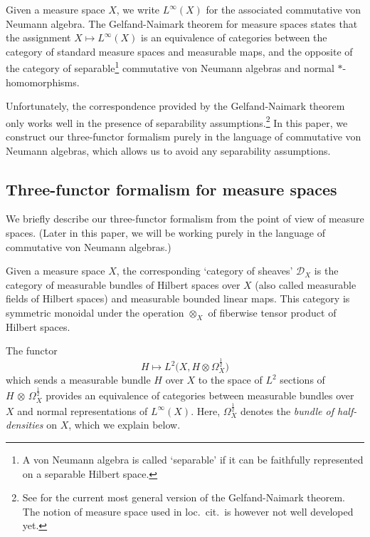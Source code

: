 \documentclass[10pt,a4paper,oneside]{amsart}
\theoremstyle{remark}
\theoremstyle{definition}
\begin{document}
Given a measure space $X$, we write $L^\infty (X)$ for the associated commutative von Neumann algebra.
The Gelfand-Naimark theorem for measure spaces states that
the assignment $X\mapsto L^\infty(X)$ is an equivalence of categories between the category of standard measure spaces and measurable maps, and the opposite of the category of separable\footnote{A von Neumann algebra is called `separable' if it can be faithfully represented on a separable Hilbert space.} commutative von Neumann algebras and normal $*$-homomorphisms.

Unfortunately,
the correspondence provided by the Gelfand-Naimark theorem only works well in the presence of separability assumptions.\footnote{See \cite{Pavlov2022} for the current most general version of the Gelfand-Naimark theorem. The notion of measure space used in loc.~cit.~is however not well developed yet.}
In this paper, we construct our three-functor formalism purely in the language of commutative von Neumann algebras, which allows us to avoid any separability assumptions.



\subsection{Three-functor formalism for measure spaces}\label{sec:threeffmeasure}
We briefly describe our three-functor formalism from the point of view of measure spaces. (Later in this paper, we will be working purely in the language of commutative von Neumann algebras.)


Given a measure space $X$, 
the corresponding `category of sheaves' $\mathcal D_X$ is the category of measurable bundles of Hilbert spaces over $X$ (also called measurable fields of Hilbert spaces) and measurable bounded linear maps. 
This category is symmetric monoidal under the operation $\otimes_X$ of fiberwise tensor product of Hilbert spaces. 

The functor
\[
H\mapsto
L^2\big(X,H\otimes \Omega^{\frac{1}{2}}_X\big)
\]
which sends a measurable bundle $H$ over $X$ to the space of $L^2$ sections of $H\,{\otimes}\,\Omega^{\frac{1}{2}}_X$ provides an equivalence of categories between measurable\vspace{-.7mm} bundles over $X$ and normal representations of $L^\infty(X)$.
Here, $\Omega^{\frac{1}{2}}_X$ denotes the \emph{bundle of half-densities} on $X$, which we explain below.
\end{document}
